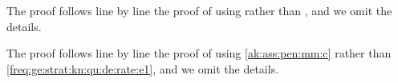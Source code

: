 \begin{pro}
The proof follows line by line the proof of  using
 rather than , and we omit the details.\proEnd  
\end{pro}
\begin{pro}
The proof follows line by line the proof of  using
\eqref{ak:ass:pen:mm:c} rather than \eqref{freq:ge:strat:kn:qu:de:rate:e1}, and we omit the details.\proEnd
\end{pro}
